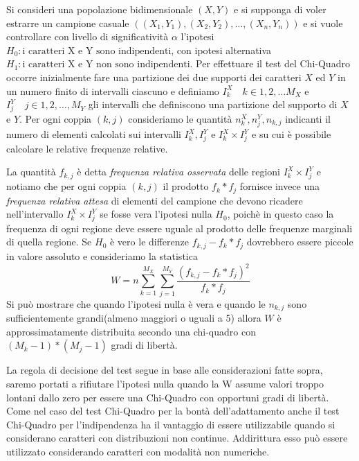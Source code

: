 Si consideri una popolazione bidimensionale $(X, Y)$ e si supponga di voler estrarre un campione casuale
$((X_1, Y_1), (X_2, Y_2), \dots, (X_n, Y_n))$ e si vuole controllare con livello di significatività $\alpha$
l'ipotesi $H_0:\mbox{i caratteri X e Y sono indipendenti}$, con ipotesi alternativa
$H_1:\mbox{i caratteri X e Y non sono indipendenti}$.\newline
Per effettuare il test del Chi-Quadro occorre inizialmente fare una partizione dei due supporti dei caratteri
$X$ ed $Y$ in un numero finito di intervalli ciascuno e definiamo $I_k^X \quad k \in 1,2,\dots M_X$ e 
$I_j^Y \quad j \in1,2, \dots, M_Y$ gli intervalli che definiscono una partizione del supporto di $X$ e $Y$.
Per ogni coppia $(k,j)$ consideriamo le quantità $n_k^X, n_j^Y, n_{k, j}$ indicanti il numero di elementi calcolati
sui intervalli $I_k^X, I_j^Y$ e $I_k^X \times I_j^Y$ e su cui è possibile calcolare le relative frequenze relative.

La quantità $f_{k, j}$ è detta \emph{frequenza relativa osservata} delle regioni $I_k^X \times I_j^Y$ e notiamo che per
ogni coppia $(k, j)$ il prodotto $f_k * f_j$ fornisce invece una \emph{frequenza relativa attesa} di elementi del
campione che devono ricadere nell'intervallo $I_k^X \times I_j^Y$ se fosse vera l'ipotesi nulla $H_0$, poichè in questo
caso la frequenza di ogni regione deve essere uguale al prodotto delle frequenze marginali di quella regione.\newline
Se $H_0$ è vero le differenze $f_{k, j} - f_k * f_j$ dovrebbero essere piccole in valore assoluto e consideriamo la statistica
\[ W = n \sum _{k = 1}^{M_X} \sum _{j = 1}^{M_Y} \frac{(f_{k, j} - f_k * f_j)^2}{f_k * f_j} \]
Si può mostrare che quando l'ipotesi nulla è vera e quando le $n_{k,j}$ sono sufficientemente grandi(almeno maggiori o
uguali a 5) allora $W$ è approssimatamente distribuita secondo una chi-quadro con $(M_k - 1) * (M_j - 1)$ gradi di libertà.

La regola di decisione del test segue in base alle considerazioni fatte sopra, saremo portati a rifiutare l'ipotesi nulla
quando la W assume valori troppo lontani dallo zero per essere una Chi-Quadro con opportuni gradi di libertà.\newline
Come nel caso del test Chi-Quadro per la bontà dell'adattamento anche il test Chi-Quadro per l'indipendenza 
ha il vantaggio di essere utilizzabile quando si considerano caratteri con distribuzioni non continue.\newline
Addirittura esso può essere utilizzato considerando caratteri con modalità non numeriche.

